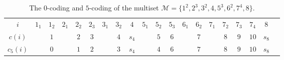 \documentclass[11pt,reqno]{amsart}
\numberwithin{equation}{section}
\theoremstyle{plain}
\theoremstyle{definition}
\newcommand{\M}{\mathcal{M}}
\begin{document}
\begin{table}[h]
\centering
\begin{tabular}{cVc|c|c|c|c|c|c|c|c|c|c|c|c|c|c|c|c|c}
$i$ & $1_1$ & $1_2$ & $2_1$ & $2_2$ & $2_3$ & $3_1$ & $3_2$ & $4$ & $5_1$ & $5_2$ & $5_3$ & $6_1$ & $6_2$ & $7_1$ & $7_2$ & $7_3$ & $7_4$ & $8$\\
\Xhline{2pt}
$c(i)$ & & $1$ & & $2$ & $3$ & & $4$ & $s_4$ & & $5$ & $6$ & & $7$ & & $8$ & $9$ & $10$ & $s_8$\\
\Xhline{0.5pt}
$c_5(i)$ & & $0$ & & $1$ & $2$ & & $3$ & $s_4$ & & $4$ & $6$ & & $7$ & & $8$ & $9$ & $10$ & $s_8$
\end{tabular}
\vspace{3mm}
\caption{The $0$-coding and $5$-coding of the multiset $\M=\{1^2,2^3,3^2,4,5^3,6^2,7^4,8\}$.}
\label{$0$-coding and $5$-coding}
\end{table}
\end{document}
